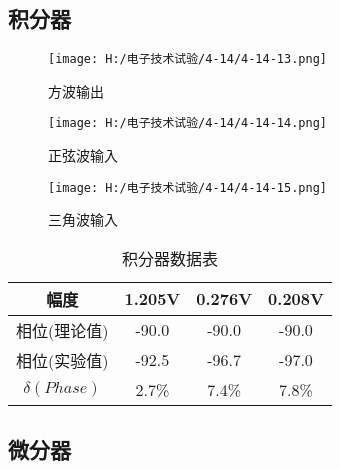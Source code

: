 \documentclass{article}
\begin{document}
         \subsection{积分器}    
          \begin{figure}[h]
              \begin{minipage}[t]{0.5\linewidth} %
                \centering   
                \texttt{[image: H:/电子技术试验/4-14/4-14-13.png]}   
                \caption{方波输出}   
                \label{fig:side:a}   
              \end{minipage}%
              \begin{minipage}[t]{0.5\linewidth}   
                \centering   
                \texttt{[image: H:/电子技术试验/4-14/4-14-14.png]}   
                \caption{正弦波输入}   
                \label{fig:side:b}   
              \end{minipage}   
              \end{figure}
              \begin{figure}[h]
                \centering
                \texttt{[image: H:/电子技术试验/4-14/4-14-15.png]}
                \caption{三角波输入} \label{fig:aa}
            \end{figure}
        \begin{table}[h]
            \centering  
            \begin{tabular}{c|c|c|c}
                \hline
                   幅度     & 1.205V    & 0.276V   & 0.208V  \\ \hline
                  相位(理论值) &   -90.0       & -90.0        &-90.0        \\ \hline
                  相位(实验值) &  -92.5        &-96.7         &-97.0      \\ \hline
                    $ \delta(Phase) $ &2.7\%&7.4\%&7.8\% \\ \hline
            \end{tabular}
          
            \caption{积分器数据表}\label{SIGN}
            \end{table}  
            \newpage


            \subsection{微分器}
       
\end{document}
